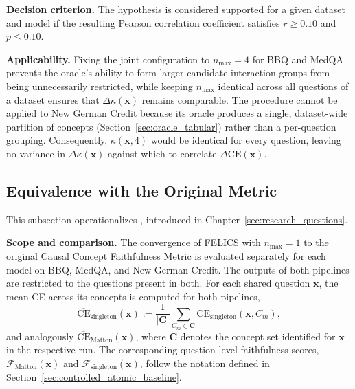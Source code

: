 \noindent\textbf{Decision criterion.} The hypothesis is considered supported for a given dataset and model if the resulting Pearson correlation coefficient satisfies $r \ge 0.10$ and $p \le 0.10$.

\noindent\textbf{Applicability.} Fixing the joint configuration to $n_{\max}=4$ for BBQ and MedQA prevents the oracle's ability to form larger candidate interaction groups from being unnecessarily restricted, while keeping $n_{\max}$ identical across all questions of a dataset ensures that $\Delta\kappa(\mathbf{x})$ remains comparable. The procedure cannot be applied to New German Credit because its oracle produces a single, dataset-wide partition of concepts (Section~\ref{sec:oracle_tabular}) rather than a per-question grouping. Consequently, $\kappa(\mathbf{x},4)$ would be identical for every question, leaving no variance in $\Delta\kappa(\mathbf{x})$ against which to correlate $\Delta \mathrm{CE}(\mathbf{x})$.

\subsection{Equivalence with the Original Metric}
This subsection operationalizes , introduced in Chapter~\ref{sec:research_questions}.

\noindent\textbf{Scope and comparison.} The convergence of FELICS with $n_{\max}=1$ to the original Causal Concept Faithfulness Metric is evaluated separately for each model on BBQ, MedQA, and New German Credit. The outputs of both pipelines are restricted to the questions present in both. For each shared question $\mathbf{x}$, the mean CE across its concepts is computed for both pipelines,
\begin{equation}
	\overline{\mathrm{CE}}_{\mathrm{singleton}}(\mathbf{x}) := \frac{1}{|\mathbf{C}|}\sum_{C_m\in\mathbf{C}} \mathrm{CE}_{\mathrm{singleton}}(\mathbf{x},C_m),
\end{equation}
and analogously $\overline{\mathrm{CE}}_{\mathrm{Matton}}(\mathbf{x})$, where $\mathbf{C}$ denotes the concept set identified for $\mathbf{x}$ in the respective run. The corresponding question-level faithfulness scores, $\mathcal{F}_{\mathrm{Matton}}(\mathbf{x})$ and $\mathcal{F}_{\mathrm{singleton}}(\mathbf{x})$, follow the notation defined in Section~\ref{sec:controlled_atomic_baseline}.

